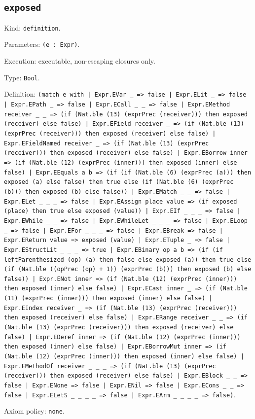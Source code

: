 \documentclass[11pt]{article}
\begin{document}
\subsection*{\texttt{exposed}}
\noindent Kind: \texttt{definition}.\par
\noindent Parameters: \texttt{(e : Expr)}.\par
\noindent Execution: executable, non-escaping closures only.\par
\noindent Type: \texttt{Bool}.\par
\noindent Definition: \texttt{(match e with | Expr.EVar \_ => false | Expr.ELit \_ => false | Expr.EPath \_ => false | Expr.ECall \_ \_ => false | Expr.EMethod receiver \_ \_ => (if (Nat.ble (13) (exprPrec (receiver))) then exposed (receiver) else false) | Expr.EField receiver \_ => (if (Nat.ble (13) (exprPrec (receiver))) then exposed (receiver) else false) | Expr.EFieldNamed receiver \_ => (if (Nat.ble (13) (exprPrec (receiver))) then exposed (receiver) else false) | Expr.EBorrow inner => (if (Nat.ble (12) (exprPrec (inner))) then exposed (inner) else false) | Expr.EEquals a b => (if (if (Nat.ble (6) (exprPrec (a))) then exposed (a) else false) then true else (if (Nat.ble (6) (exprPrec (b))) then exposed (b) else false)) | Expr.EMatch \_ \_ => false | Expr.ELet \_ \_ \_ => false | Expr.EAssign place value => (if exposed (place) then true else exposed (value)) | Expr.EIf \_ \_ \_ => false | Expr.EWhile \_ \_ => false | Expr.EWhileLet \_ \_ \_ => false | Expr.ELoop \_ => false | Expr.EFor \_ \_ \_ => false | Expr.EBreak => false | Expr.EReturn value => exposed (value) | Expr.ETuple \_ => false | Expr.EStructLit \_ \_ \_ => true | Expr.EBinary op a b => (if (if leftParenthesized (op) (a) then false else exposed (a)) then true else (if (Nat.ble ((opPrec (op) + 1)) (exprPrec (b))) then exposed (b) else false)) | Expr.ENot inner => (if (Nat.ble (12) (exprPrec (inner))) then exposed (inner) else false) | Expr.ECast inner \_ => (if (Nat.ble (11) (exprPrec (inner))) then exposed (inner) else false) | Expr.EIndex receiver \_ => (if (Nat.ble (13) (exprPrec (receiver))) then exposed (receiver) else false) | Expr.ERange receiver \_ \_ => (if (Nat.ble (13) (exprPrec (receiver))) then exposed (receiver) else false) | Expr.EDeref inner => (if (Nat.ble (12) (exprPrec (inner))) then exposed (inner) else false) | Expr.EBorrowMut inner => (if (Nat.ble (12) (exprPrec (inner))) then exposed (inner) else false) | Expr.EMethodOf receiver \_ \_ \_ => (if (Nat.ble (13) (exprPrec (receiver))) then exposed (receiver) else false) | Expr.EBlock \_ \_ => false | Expr.ENone => false | Expr.ENil => false | Expr.ECons \_ \_ => false | Expr.ELetS \_ \_ \_ \_ => false | Expr.EArm \_ \_ \_ \_ => false)}.\par
\noindent Axiom policy: \texttt{none}.\par
\end{document}
